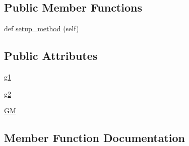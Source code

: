 \subsection*{Public Member Functions}
\begin{DoxyCompactItemize}
\item 
def \hyperlink{classnetworkx_1_1algorithms_1_1isomorphism_1_1tests_1_1test__vf2userfunc_1_1TestEdgeMatch__MultiDiGraph_a7df0b4ba826796d3f292242c11329466}{setup\+\_\+method} (self)
\end{DoxyCompactItemize}
\subsection*{Public Attributes}
\begin{DoxyCompactItemize}
\item 
\hyperlink{classnetworkx_1_1algorithms_1_1isomorphism_1_1tests_1_1test__vf2userfunc_1_1TestEdgeMatch__MultiDiGraph_a2fe7f5af12098401ff912bf1af46415a}{g1}
\item 
\hyperlink{classnetworkx_1_1algorithms_1_1isomorphism_1_1tests_1_1test__vf2userfunc_1_1TestEdgeMatch__MultiDiGraph_ab8d7d3686adbc1aa42bea4e3fa29c786}{g2}
\item 
\hyperlink{classnetworkx_1_1algorithms_1_1isomorphism_1_1tests_1_1test__vf2userfunc_1_1TestEdgeMatch__MultiDiGraph_ab2ea8790af490f522aa750cb58ea54d1}{GM}
\end{DoxyCompactItemize}


\subsection{Member Function Documentation}
\mbox{\label{classnetworkx_1_1algorithms_1_1isomorphism_1_1tests_1_1test__vf2userfunc_1_1TestEdgeMatch__MultiDiGraph_a7df0b4ba826796d3f292242c11329466}} 

